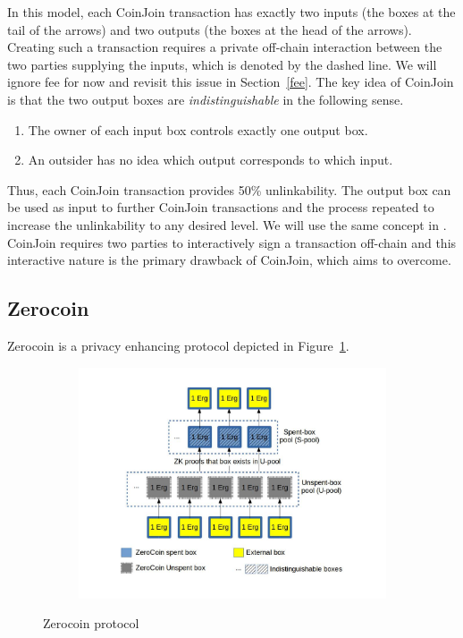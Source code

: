 \documentclass[runningheads]{llncs}
\newcommand{\zerocoin}{Zerocoin\xspace}
\begin{document}
In this model, each CoinJoin transaction has exactly two inputs (the boxes at the tail of the arrows) and two outputs (the boxes at the head of the arrows). Creating such a transaction requires a private off-chain interaction between the two parties supplying the inputs, which is denoted by the dashed line. We will ignore fee for now and revisit this issue in Section~\ref{fee}.
The key idea of CoinJoin is that the two output boxes are {\em indistinguishable} in the following sense. 
\begin{enumerate}
    \item The owner of each input box controls exactly one output box.
    \item An outsider has no idea which output corresponds to which input.
\end{enumerate}

Thus, each CoinJoin transaction provides 50\% unlinkability. The output box can be used as input to further CoinJoin transactions and the process repeated to increase the unlinkability to any desired level. We will use the same concept in \algname. 
CoinJoin requires two parties to interactively sign a transaction off-chain and this interactive nature is the primary drawback of CoinJoin, which \algname aims to overcome. 

\subsection{\zerocoin}
\label{zerocoin} 

\zerocoin is a privacy enhancing protocol depicted in Figure~\ref{fig:zerocoin}. 

\begin{figure}[h]
	\centering
	\begin{subfigure}{.8\textwidth}
		\centering
		\includegraphics[width=\linewidth]{ZeroCoin.jpg}
	\end{subfigure}
	\caption{\zerocoin protocol}
	\label{fig:zerocoin}
\end{figure}
\end{document}
